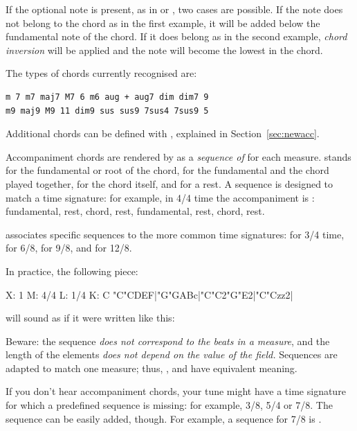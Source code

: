\documentclass[a4paper,fullpage,12pt]{book}
\begin{document}
If the optional note is present, as in  or , two cases are
possible. If the note does not belong to the chord as in the first example,
it will be added below the fundamental note of the chord. If it does belong
as in the second example, \emph{chord inversion} will be applied and the
note will become the lowest in the chord.

The types of chords currently recognised are:

\begin{verbatim}
m 7 m7 maj7 M7 6 m6 aug + aug7 dim dim7 9
m9 maj9 M9 11 dim9 sus sus9 7sus4 7sus9 5
\end{verbatim}

Additional chords can be defined with ,
explained in Section~\ref{sec:newacc}.

Accompaniment chords are rendered by \abcmid{} as a \emph{sequence of
} for each measure.  stands for the fundamental or
root of the chord,  for the fundamental and the chord played
together,  for the chord itself, and  for a rest. A
 sequence is designed to match a time signature: for
example, in 4/4 time the accompaniment is : fundamental,
rest, chord, rest, fundamental, rest, chord, rest.

\abcmid{} associates specific  sequences to the more common
time signatures:  for 3/4 time,  for 6/8,
 for 9/8, and  for 12/8.

In practice, the following piece:

\begin{abcsource}
X: 1
M: 4/4
L: 1/4
K: C
%
"C"CDEF|"G"GABc|"C"C2"G"E2|"C"Czz2|
\end{abcsource}

will sound as if it were written like this:


Beware: the  sequence \emph{does not correspond to the beats
in a measure}, and the length of the elements \emph{does not depend on
the value of the  field.} Sequences are adapted to match one
measure; thus, ,  and  have
equivalent meaning.

If you don't hear accompaniment chords, your tune might have a time
signature for which a predefined  sequence is missing:
for example, 3/8, 5/4 or 7/8. The sequence can be easily added,
though. For example, a sequence for 7/8 is .
\end{document}
